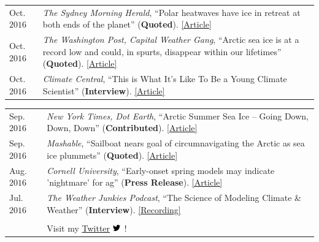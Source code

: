 \documentclass[margin,line,palatino,courier,10pt]{res}
\begin{document}
\begin{resume}
\begin{tabular}{@{}p{0.8in}p{4in}}
Oct. $2016$ & \textit{The Sydney Morning Herald}, ``Polar heatwaves have ice in retreat at both ends of the planet'' (\textbf{Quoted}). \href{http://www.smh.com.au/environment/climate-change/polar-heatwaves-have-ice-in-retreat-at-both-ends-of-the-planet-20161030-gse9q6.html}{[Article]}\\
Oct. $2016$ & \textit{The Washington Post, Capital Weather Gang}, ``Arctic sea ice is at a record low and could, in spurts, disappear within our lifetimes'' (\textbf{Quoted}). \href{https://www.washingtonpost.com/news/capital-weather-gang/wp/2016/10/27/arctic-sea-ice-is-at-a-record-low-and-could-in-spurts-disappear-within-our-lifetimes/}{[Article]}\\
Oct. $2016$ & \textit{Climate Central}, ``This is What It's Like To Be a Young Climate Scientist'' (\textbf{Interview}). \href{http://www.climatecentral.org/news/young-climate-scientists-interviews-20799}{[Article]}\\
\end{tabular}
\begin{tabular}{@{}p{0.8in}p{4in}}
Sep. $2016$ & \textit{New York Times, Dot Earth}, ``Arctic Summer Sea Ice -- Going Down, Down, Down'' (\textbf{Contributed}). \href{http://dotearth.blogs.nytimes.com/2016/09/16/arctic-summer-sea-ice-going-down-down-down/?module=BlogPost-ReadMore&version=Blog\%20Main&action=Click&contentCollection=arctic&pgtype=Blogs&region=Body&_r=1#more-58318}{[Article]}\\
Sep. $2016$ & \textit{Mashable}, ``Sailboat nears goal of circumnavigating the Arctic as sea ice plummets'' (\textbf{Quoted}). \href{http://mashable.com/2016/09/01/sailboat-arctic-ice-melt-open-water/#s7nzft8m6sqB}{[Article]}\\
Aug. $2016$ & \textit{Cornell University}, ``Early-onset spring models may indicate 'nightmare' for ag'' (\textbf{Press Release}). \href{http://www.news.cornell.edu/stories/2016/08/early-onset-spring-models-may-indicate-nightmare-ag}{[Article]}\\
Jul. $2016$ & \textit{The Weather Junkies Podcast}, ``The Science of Modeling Climate \& Weather'' (\textbf{Interview}). \href{https://www.youtube.com/watch?v=vgT5P9zC91U}{[Recording]}\\\\

& Visit my \href{https://twitter.com/ZLabe}{Twitter} \includegraphics[height=9pt]{twitter.png}\ !\\
\end{tabular}


\end{resume}
\end{document}
